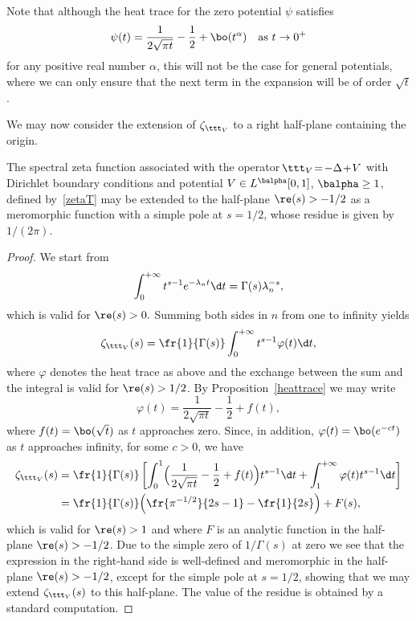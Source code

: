 \begin{remark}
Note that although the heat trace for the zero potential $\psi$ satisfies
\[
\psi(t)=\frac{1}{2\sqrt{\pi t}} - \frac{1}{2} + \bo(t^{\alpha}) \quad\text{as } t\to 0^{+}
\]
for any positive real number $\alpha$, this will not be the case for general potentials, where we can only ensure that the next term in the expansion
will be of order $\sqrt{t}$.
\end{remark}

We may now consider the extension of $\zeta_{\ttt_V}$ to a right half-plane containing the origin.

\begin{prop}\label{meromorphicext}
The spectral zeta function associated with the operator \hbox{$\!\ttt_V\!=\!-\Delta\!+\!V$} with Dirichlet boundary conditions and potential $V\in L^{\balpha}[0,1]$, $\balpha\geq 1$,
defined by~\eqref{zetaT} may be extended to the half-plane $\re(s)>-1/2$ as a meromorphic function with a simple pole at $s=1/2$, whose residue is
given by $1/(2\pi)$.
\end{prop}
\begin{proof}
We start from
\[
\int_{0}^{+\infty} t^{s-1} e^{-\lambda_{n}t} \d t = \Gamma(s) \lambda_{n}^{-s},
\]
which is valid for $\re(s)>0.$ Summing both sides in $n$ from one to infinity yields
\[
\zeta_{\ttt_V}(s) = \fr{1}{\Gamma(s)} \int_{0}^{+\infty} t^{s-1} \varphi(t) \d t,
\]
where $\varphi$ denotes the heat trace as above and the exchange between the sum and the integral is valid for $\re(s)>1/2$.
By Proposition~\ref{heattrace} we may write
\[
\varphi(t) = \frac{1}{2\sqrt{\pi t}} - \frac{1}{2} + f(t),
\]
where $f(t) = \bo(\sqrt{t})$ as $t$ approaches zero. Since, in addition, $\varphi(t) = \bo(e^{-ct})$ as $t$ approaches infinity, for some $c>0$, we have
\begin{align*}
\zeta_{\ttt_V}(s) & = \fr{1}{\Gamma(s)}\left[ \int_{0}^{1} \Bigl(\frac{1}{2\sqrt{\pi t}} - \frac{1}{2} + f(t) \Bigr) t^{s-1} \d t +
\int_{1}^{+\infty} \varphi(t) t^{s-1} \d t\right]\\
& = \fr{1}{\Gamma(s)}\Bigl(\fr{\pi^{-1/2}}{2s-1} -\fr{1}{2s} \Bigr) + F(s),
\end{align*}
which is valid for $\re(s)>1$ and where $F$ is an analytic function in the half-plane $\re(s)>-1/2$. Due to the simple zero of $1/\Gamma(s)$
at zero we see that the expression in the right-hand side is well-defined and meromorphic in the half-plane $\re(s)>-1/2$, except for the
simple pole at $s=1/2$, showing that we may extend $\zeta_{\ttt_V}(s)$ to this half-plane. The value of the residue is obtained by a
standard computation.
\end{proof}
